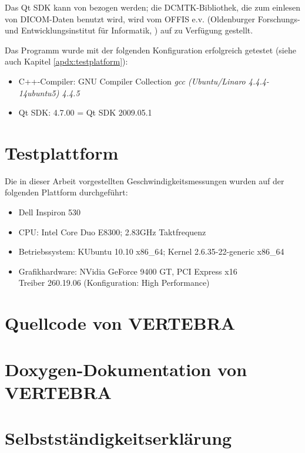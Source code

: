 \documentclass[a4paper]{scrartcl}
\begin{document}
Das Qt SDK kann von \cite{QtMainSite} bezogen werden; die DCMTK-Bibliothek, die zum einlesen von DICOM-Daten benutzt wird, wird vom OFFIS e.v. (Oldenburger Forschungs- und Entwicklungsinstitut für Informatik, \cite{OFFISMainSite}) auf \cite{DCMTKMainSite} zu Verfügung gestellt.

Das Programm wurde mit der folgenden Konfiguration erfolgreich getestet (siehe auch Kapitel \vref{apdx:testplatform}):
\begin{itemize}
 \item C++-Compiler: GNU Compiler Collection \textit{gcc (Ubuntu/Linaro 4.4.4-14ubuntu5) 4.4.5}
 \item Qt SDK: 4.7.00 = Qt SDK 2009.05.1
\end{itemize}

\section{Testplattform}\label{apdx:testplatform}
Die in dieser Arbeit vorgestellten Geschwindigkeitsmessungen wurden auf der folgenden Plattform durchgeführt:
\begin{itemize}
  \item Dell Inspiron 530
  \item CPU: Intel\textsuperscript{\textregistered} Core Duo E8300; 2.83GHz Taktfrequenz
  \item Betriebssystem: KUbuntu 10.10 x86\_64; Kernel 2.6.35-22-generic x86\_64
  \item Grafikhardware: NVidia\textsuperscript{\textregistered} GeForce 9400 GT, PCI Express x16\\
	Treiber 260.19.06 (Konfiguration: High Performance)
\end{itemize}
\section{Quellcode von VERTEBRA}
\section{Doxygen-Dokumentation von VERTEBRA}
\section{Selbstständigkeitserklärung}
\newpage
\nocite{*}


\end{document}
